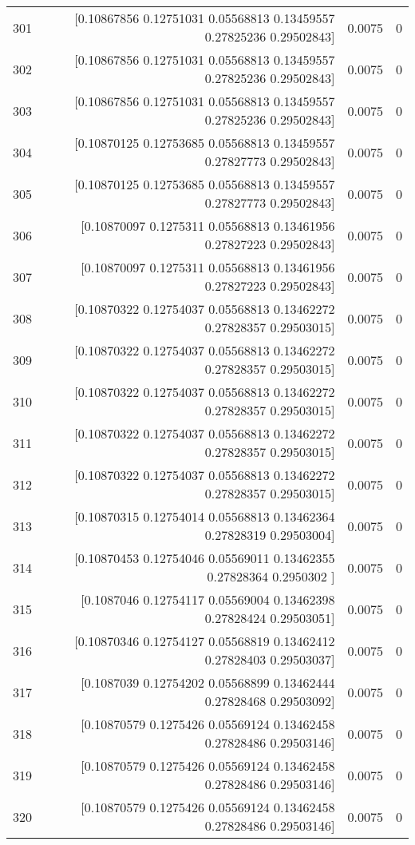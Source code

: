 \begin{longtable}{lrrr}
301 & [0.10867856 0.12751031 0.05568813 0.13459557 0.27825236 0.29502843] & 0.0075 & 0 \\
302 & [0.10867856 0.12751031 0.05568813 0.13459557 0.27825236 0.29502843] & 0.0075 & 0 \\
303 & [0.10867856 0.12751031 0.05568813 0.13459557 0.27825236 0.29502843] & 0.0075 & 0 \\
304 & [0.10870125 0.12753685 0.05568813 0.13459557 0.27827773 0.29502843] & 0.0075 & 0 \\
305 & [0.10870125 0.12753685 0.05568813 0.13459557 0.27827773 0.29502843] & 0.0075 & 0 \\
306 & [0.10870097 0.1275311  0.05568813 0.13461956 0.27827223 0.29502843] & 0.0075 & 0 \\
307 & [0.10870097 0.1275311  0.05568813 0.13461956 0.27827223 0.29502843] & 0.0075 & 0 \\
308 & [0.10870322 0.12754037 0.05568813 0.13462272 0.27828357 0.29503015] & 0.0075 & 0 \\
309 & [0.10870322 0.12754037 0.05568813 0.13462272 0.27828357 0.29503015] & 0.0075 & 0 \\
310 & [0.10870322 0.12754037 0.05568813 0.13462272 0.27828357 0.29503015] & 0.0075 & 0 \\
311 & [0.10870322 0.12754037 0.05568813 0.13462272 0.27828357 0.29503015] & 0.0075 & 0 \\
312 & [0.10870322 0.12754037 0.05568813 0.13462272 0.27828357 0.29503015] & 0.0075 & 0 \\
313 & [0.10870315 0.12754014 0.05568813 0.13462364 0.27828319 0.29503004] & 0.0075 & 0 \\
314 & [0.10870453 0.12754046 0.05569011 0.13462355 0.27828364 0.2950302 ] & 0.0075 & 0 \\
315 & [0.1087046  0.12754117 0.05569004 0.13462398 0.27828424 0.29503051] & 0.0075 & 0 \\
316 & [0.10870346 0.12754127 0.05568819 0.13462412 0.27828403 0.29503037] & 0.0075 & 0 \\
317 & [0.1087039  0.12754202 0.05568899 0.13462444 0.27828468 0.29503092] & 0.0075 & 0 \\
318 & [0.10870579 0.1275426  0.05569124 0.13462458 0.27828486 0.29503146] & 0.0075 & 0 \\
319 & [0.10870579 0.1275426  0.05569124 0.13462458 0.27828486 0.29503146] & 0.0075 & 0 \\
320 & [0.10870579 0.1275426  0.05569124 0.13462458 0.27828486 0.29503146] & 0.0075 & 0 \\

\end{longtable}

